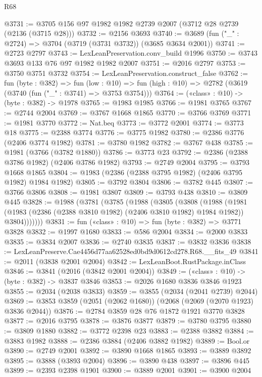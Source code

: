 \begin{lexlean}{R68}
\begin{coremodule}
@3731 := @3705 @156 @97 @1982 @1982 @2739 @2007 (@3712 @28 @2739 (@2136 (@3715 @28)))
@3732 := @2156 @3693
@3740 := @3689 (fun ("_" : @2724) => @3704 (@3719 (@3731 @3732)) (@3685 @3634 @2001))
@3741 := @2723 @2797
@3743 := LexLeanPreservation.conv_build @1996
@3750 := @3743 @3693 @133 @76 @97 @1982 @1982 @2007
@3751 := @2016 @2797
@3753 := @3750 @3751 @3732
@3754 := LexLeanPreservation.construct_false
@3762 := fun (byte : @382) =>
  fun (low : @10) => fun (high : @10) => @2782 (@3619 (@3740 (fun ("_" : @3741) => @3753 @3754)))
@3764 := («class» : @10) -> (byte : @382) -> @1978
@3765 := @1983 @1985
@3766 := @1981 @3765
@3767 := @2744 @2004
@3769 := @3767 @1668 @1865
@3770 := @3766 @3769
@3771 := @1981 @3770
@3772 := Nat.beq
@3773 := @3772 @2001
@3774 := @3773 @18
@3775 := @2388 @3774
@3776 := @3775 @1982
@3780 := @2386 @3776 (@2406 @3774 @1982)
@3781 := @3780 @1982
@3782 := @3767 @438
@3785 := @1981 (@3766 (@3782 @1880))
@3786 := @3773 @23
@3792 := @2386 (@2388 @3786 @1982) (@2406 @3786 @1982)
@3793 := @2749 @2004
@3795 := @3793 @1668 @1865
@3804 := @1983 (@2386 (@2388 @3795 @1982) (@2406 @3795 @1982) @1984 @1982)
@3805 := @3792 @3804
@3806 := @3782 @445
@3807 := @3766 @3806
@3808 := @1981 @3807
@3809 := @3793 @438
@3810 := @3809 @445
@3828 := @1988
    (@3781
      (@3785
        (@1988
          (@3805
            (@3808
              (@1988
                (@1981
                  (@1983 (@2386 (@2388 @3810 @1982) (@2406 @3810 @1982) @1984 @1982))
                  @3804)))))))
@3831 := fun («class» : @10) => fun (byte : @382) => @3771 @3828
@3832 := @1997 @1680
@3833 := @586 @2004
@3834 := @2000 @3833
@3835 := @3834 @2007
@3836 := @2740 @3835
@3837 := @3832 @3836
@3838 := LexLeanPreserve.Cae4456d77aa62528ed0bd9d0612cd278.R68.__fits_49
@3841 := @2011 (@3838 @2001 @2004)
@3842 := LexLeanBoot.RustPackage.inClass
@3846 := @3841 (@2016 (@3842 @2001 @2004))
@3849 := («class» : @10) -> (byte : @382) -> @3837 @3846
@3853 := @2026 @1680 @3836 @3846 @1923
@3855 := @2034 (@2038 @3833)
@3859 := @3855 (@2034 (@2041 @2739) @2044)
@3869 := @3853 @3859 (@2051 (@2062 @1680)) (@2068 (@2069 (@2070 @1923) @3836 @2044))
@3876 := @2784 @3859 @28 @76 @1872 @1921 @3770 @3828
@3877 := @2016 @3795
@3878 := @3876 @3877
@3879 := @3780 @3795
@3880 := @3809 @1880
@3882 := @3772 @2398 @23
@3883 := @2388 @3882
@3884 := @3883 @1982
@3888 := @2386 @3884 (@2406 @3882 @1982)
@3889 := Bool.or
@3890 := @2749 @2001
@3892 := @3890 @1668 @1865
@3893 := @3889 @3892
@3895 := @3888 (@3893 @2004)
@3896 := @3890 @438
@3897 := @3896 @445
@3899 := @2393 @2398 @1901
@3900 := @3889 @2001
@3901 := @3900 @2004

\end{coremodule}
\end{lexlean}
